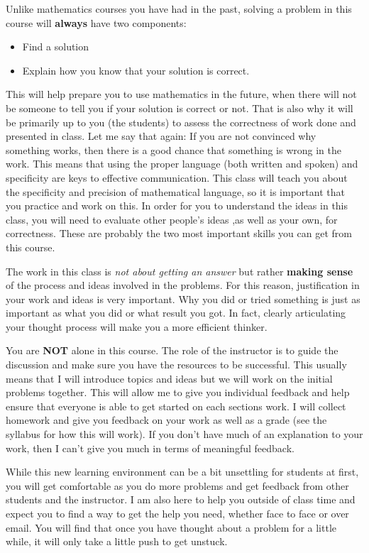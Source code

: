 Unlike mathematics courses you have had in the past, solving a problem in this course will \textbf{always} have two components:
\begin{itemize}
\item Find a solution
\item Explain how you know that your solution is correct.
\end{itemize}
This will help prepare you to use mathematics in the future, when there will not be someone to tell you if your solution is correct or not. That is also why it will be primarily up to you (the students) to assess the correctness of work done and presented in class. Let me say that again: If you are not convinced why something works, then there is a good chance that something is wrong in the work. This means that using the proper language (both written and spoken) and specificity are keys to effective communication. This class will teach you about the specificity and precision of mathematical language, so it is important that you practice and work on this. In order for you to understand the ideas in this class, you will need to evaluate other people's ideas ,as well as your own, for correctness. These are probably the two most important skills you can get from this course.

The work in this class is \emph{not about getting an answer} but rather \textbf{making sense} of the process and ideas involved in the problems. For this reason, justification in your work and ideas is very important. Why you did or tried something is just as important as what you did or what result you got. In fact, clearly articulating your thought process will make you a more efficient thinker.

You are \textbf{NOT} alone in this course. The role of the instructor is to guide the discussion and make sure you have the resources to be successful. This usually means that I will introduce topics and ideas but we will work on the initial problems together. This will allow me to give you individual feedback and help ensure that everyone is able to get started on each sections work. I will collect homework and give you feedback on your work as well as a grade (see the syllabus for how this will work). If you don't have much of an explanation to your work, then I can't give you much in terms of meaningful feedback.

While this new learning environment can be a bit unsettling for students at first, you will get comfortable as you do more problems and get feedback from other students and the instructor. I am also here to help you outside of class time and expect you to find a way to get the help you need, whether face to face or over email. You will find that once you have thought about a problem for a little while, it will only take a little push to get unstuck.


